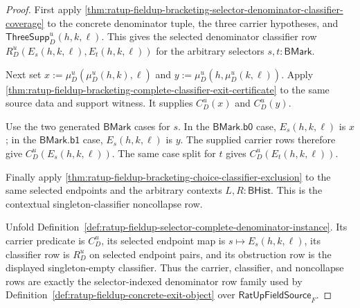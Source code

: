 \begin{proof}
First apply
\autoref{thm:ratup-fieldup-bracketing-selector-denominator-classifier-coverage}
to the concrete denominator tuple, the three carrier hypotheses, and
$\mathsf{ThreeSupp}_D^u(h,k,\ell)$. This gives the selected denominator
classifier row
$R_D^u(E_s(h,k,\ell),E_t(h,k,\ell))$ for the arbitrary selectors
$s,t:\mathsf{BMark}$.

Next set $x:=\mu_D^u(\mu_D^u(h,k),\ell)$ and
$y:=\mu_D^u(h,\mu_D^u(k,\ell))$. Apply
\autoref{thm:ratup-fieldup-bracketing-complete-classifier-exit-certificate}
to the same source data and support witness. It supplies $C_D^u(x)$ and
$C_D^u(y)$.

Use the two generated $\mathsf{BMark}$ cases for $s$. In the
$\mathsf{BMark.b0}$ case, $E_s(h,k,\ell)$ is $x$; in the
$\mathsf{BMark.b1}$ case, $E_s(h,k,\ell)$ is $y$. The supplied carrier rows
therefore give $C_D^u(E_s(h,k,\ell))$. The same case split for $t$ gives
$C_D^u(E_t(h,k,\ell))$.

Finally apply
\autoref{thm:ratup-fieldup-bracketing-choice-classifier-exclusion} to the same
selected endpoints and the arbitrary contexts $L,R:\mathsf{BHist}$. This is
the contextual singleton-classifier noncollapse row.

Unfold Definition~\ref{def:ratup-fieldup-selector-complete-denominator-instance}.
Its carrier predicate is $C_D^u$, its selected endpoint map is
$s\mapsto E_s(h,k,\ell)$, its classifier row is $R_D^u$ on selected endpoint
pairs, and its obstruction row is the displayed singleton-empty classifier.
Thus the carrier, classifier, and noncollapse rows are exactly the
selector-indexed denominator row family used by
Definition~\ref{def:ratup-fieldup-concrete-exit-object} over
$\mathsf{RatUpFieldSource}_F$.
\end{proof}

